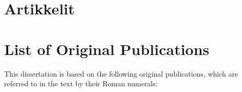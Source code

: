 \chapter*{Artikkelit}
\else
\chapter*{List of Original Publications}
\fi
This dissertation is based on the following original publications, which
are referred to in the text by their Roman numerals:


